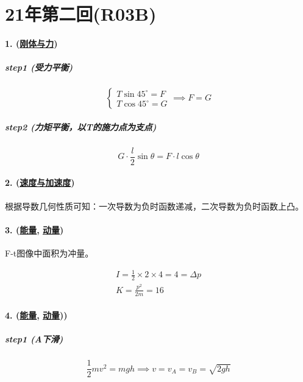 
\section{21年第二回(R03B)}

\paragraph{1. (\hyperref[subsec:刚体与力]{刚体与力})}

\subparagraph{step1 (受力平衡)}

\begin{equation*}
    \begin{cases}
        T\sin45^\circ=F\\
        T\cos45^\circ=G
    \end{cases}\implies F=G
\end{equation*}

\subparagraph{step2 (力矩平衡，以T的施力点为支点)}

\begin{equation*}
    G\cdot\frac{l}{2}\sin\theta=F\cdot l\cos\theta
\end{equation*}

\paragraph{2. (\hyperref[subsec:速度与加速度]{速度与加速度})} 根据导数几何性质可知：一次导数为负时函数递减，二次导数为负时函数上凸。
\paragraph{3. (\hyperref[subsec:能量]{能量}, \hyperref[subsec:动量]{动量})} F-t图像中面积为冲量。

\begin{gather*}
    I=\frac12\times2\times4=4=\Delta p\\
    K=\frac{p^2}{2m}=16
\end{gather*}

\paragraph{4. (\hyperref[subsec:能量]{能量}, \hyperref[subsec:动量]{动量}))}

\subparagraph{step1 (A下滑)}

\begin{equation*}
    \frac12mv^2=mgh\implies v=v_A=v_B=\sqrt{2gh}
\end{equation*}

